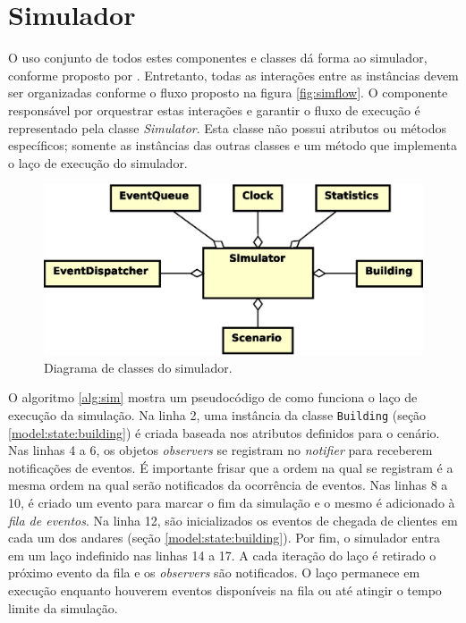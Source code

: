 \section{\label{model:simulador}Simulador}

O uso conjunto de todos estes componentes e classes dá forma ao simulador,
conforme proposto por \cite{Law,Banks}. Entretanto, todas as interações entre as
instâncias devem ser organizadas conforme o fluxo proposto na figura
\ref{fig:simflow}. O componente responsável por orquestrar estas interações e
garantir o fluxo de execução é representado pela classe \textit{Simulator}. Esta
classe não possui atributos ou métodos específicos; somente as instâncias das
outras classes e um método que implementa o laço de execução do simulador.

\begin{figure}[htb!]
  \centering
  \includegraphics[scale=0.6]{img/Simulator}
  \caption{Diagrama de classes do simulador.}
\label{fig:diagram:simulator}
\end{figure}

O algoritmo \ref{alg:sim} mostra um pseudocódigo de como funciona o laço de
execução da simulação. Na linha 2, uma instância da classe \texttt{Building}
(seção \ref{model:state:building}) é criada baseada nos atributos definidos para
o cenário. Nas linhas 4 a 6, os objetos \textit{observers} se registram no
\textit{notifier} para receberem notificações de eventos. É importante frisar
que a ordem na qual se registram é a mesma ordem na qual serão notificados da
ocorrência de eventos. Nas linhas 8 a 10, é criado um evento para marcar o fim
da simulação e o mesmo é adicionado à \textit{fila de eventos}. Na linha 12, são
inicializados os eventos de chegada de clientes em cada um dos andares (seção
\ref{model:state:building}). Por fim, o simulador entra em um laço indefinido
nas linhas 14 a 17. A cada iteração do laço é retirado o próximo evento da fila
e os \textit{observers} são notificados. O laço permanece em execução enquanto
houverem eventos disponíveis na fila ou até atingir o tempo limite da simulação.

